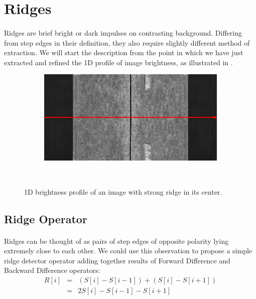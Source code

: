 \section{Ridges}

\paragraph*{}
Ridges are brief bright or dark impulses on contrasting background. Differing from step edges in their definition, they also require slightly different method of extraction. We will start the description from the point in which we have just extracted and refined the 1D profile of image brightness, as illustrated in .

\begin{figure}[h!]
    \begin{subfigure}[b]{\basicWidth}
		\includegraphics[width=\linewidth]{img/1DEdgeDetection/ridges_scan}
    \end{subfigure}%
    ~
    \begin{subfigure}[b]{\basicWidth}
    \end{subfigure}
    \caption{1D brightness profile of an image with strong ridge in its center.}
    \label{fig:RidgesProfile}
\end{figure}

\subsection{Ridge Operator}

\paragraph*{}
Ridges can be thought of as pairs of step edges of opposite polarity lying extremely close to each other. We could use this observation to propose a simple ridge detector operator adding together results of Forward Difference and Backward Difference operators:
\begin{eqnarray*}
R[i] & = & (S[i]-S[i-1])+(S[i]-S[i+1]) \\
	& = & 2S[i]-S[i-1]-S[i+1]
\end{eqnarray*}

